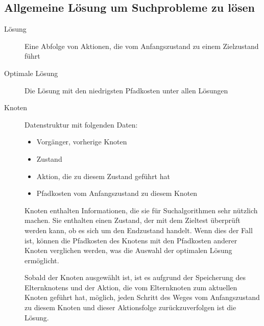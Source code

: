 \subsection{Allgemeine Lösung um Suchprobleme zu lösen}

\begin{description}
 \item [Lösung] Eine Abfolge von Aktionen, die vom Anfangszustand zu einem Zielzustand führt
 \item [Optimale Lösung] Die Lösung mit den niedrigsten Pfadkosten unter allen Lösungen
 \item [Knoten] Datenstruktur mit folgenden Daten:
      \begin{itemize}
      \item Vorgänger, vorherige Knoten
      \item Zustand
      \item Aktion, die zu diesem Zustand geführt hat
      \item Pfadkosten vom Anfangszustand zu diesem Knoten
      \end{itemize}
   Knoten enthalten Informationen, die sie für Suchalgorithmen sehr nützlich machen. Sie enthalten einen Zustand, der mit dem Zieltest überprüft werden kann, ob es sich um den Endzustand handelt. Wenn dies der Fall ist, können die Pfadkosten des Knotens mit den Pfadkosten anderer Knoten verglichen werden, was die Auswahl der optimalen Lösung ermöglicht.

   Sobald der Knoten ausgewählt ist, ist es aufgrund der Speicherung des Elternknotens und der Aktion, die vom Elternknoten zum aktuellen Knoten geführt hat, möglich, jeden Schritt des Weges vom Anfangszustand zu diesem Knoten und dieser Aktionsfolge zurückzuverfolgen ist die Lösung.
\end{description}



